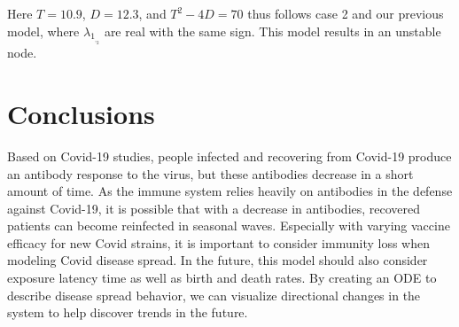 \documentclass[%
 reprint,
]{revtex4-2}
\begin{document}
Here $T=10.9$, $D=12.3$, and $T^2-4D=70$ thus follows case 2 and our previous model, where $\lambda_1_,_2$ are real with the same sign. This model results in an unstable node. \\


\section{\label{sec:level1}Conclusions\protect\\}

Based on Covid-19 studies, people infected and recovering from Covid-19 produce an antibody response to the virus, but these antibodies decrease in a short amount of time. As the immune system relies heavily on antibodies in the defense against Covid-19, it is possible that with a decrease in antibodies, recovered patients can become reinfected in seasonal waves. Especially with varying vaccine efficacy for new Covid strains, it is important to consider immunity loss when modeling Covid disease spread. In the future, this model should also consider exposure latency time as well as birth and death rates. By creating an ODE to describe disease spread behavior, we can visualize directional changes in the system to help discover trends in the future. 


\nocite{*}

\end{document}
